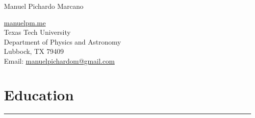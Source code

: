 \documentclass[letterpaper,10pt]{article}
\def\name{Manuel Pichardo Marcano}
\begin{document}
\begin{huge}
\name
\end{huge}





\vspace{.3 cm}

\begin{minipage}{0.6\linewidth}
  \href{www.manuelpm.me}{manuelpm.me} \\
  Texas Tech University \\
  Department of Physics and Astronomy \\
  Lubbock, TX 79409\\
 Email: \href{mailto:manuelpichardom@gmail.com}{ manuelpichardom@gmail.com}
\end{minipage}

\section*{Education}

\hrule
\vspace{.3 cm}
\end{document}
